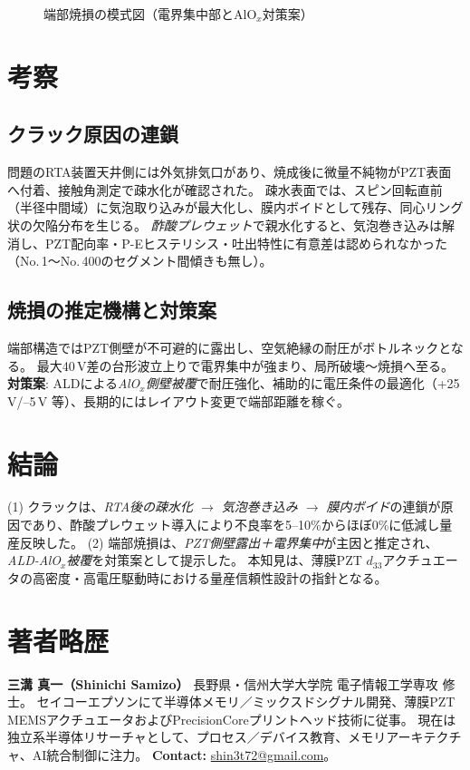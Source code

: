 \documentclass[11pt,a4paper]{ltjsarticle} %
\begin{document}
\begin{figure}[h]
  \centering
  
  \caption{端部焼損の模式図（電界集中部とAlO$_x$対策案）}
  \label{fig:edge}
\end{figure}

\section{考察}
\subsection{クラック原因の連鎖}
問題のRTA装置天井側には外気排気口があり、焼成後に微量不純物がPZT表面へ付着、接触角測定で疎水化が確認された。
疎水表面では、スピン回転直前（半径中間域）に気泡取り込みが最大化し、膜内ボイドとして残存、同心リング状の欠陥分布を生じる。
\emph{酢酸プレウェット}で親水化すると、気泡巻き込みは解消し、PZT配向率・P-Eヒステリシス・吐出特性に有意差は認められなかった（No.\,1～No.\,400のセグメント間傾きも無し）。

\subsection{焼損の推定機構と対策案}
端部構造ではPZT側壁が不可避的に露出し、空気絶縁の耐圧がボトルネックとなる。
最大40\,V差の台形波立上りで電界集中が強まり、局所破壊～焼損へ至る。
\textbf{対策案}: ALDによる\emph{AlO$_x$側壁被覆}で耐圧強化、補助的に電圧条件の最適化（+25\,V/--5\,V 等）、長期的にはレイアウト変更で端部距離を稼ぐ。

\section{結論}
(1) クラックは、\emph{RTA後の疎水化 $\rightarrow$ 気泡巻き込み $\rightarrow$ 膜内ボイド}の連鎖が原因であり、酢酸プレウェット導入により不良率を5--10\%からほぼ0\%に低減し量産反映した。
(2) 端部焼損は、\emph{PZT側壁露出＋電界集中}が主因と推定され、\emph{ALD-AlO$_x$被覆}を対策案として提示した。
本知見は、薄膜PZT $d_{33}$アクチュエータの高密度・高電圧駆動時における量産信頼性設計の指針となる。

\section*{著者略歴}
\textbf{三溝 真一（Shinichi Samizo）} 長野県・信州大学大学院 電子情報工学専攻 修士。
セイコーエプソンにて半導体メモリ／ミックスドシグナル開発、薄膜PZT MEMSアクチュエータおよびPrecisionCoreプリントヘッド技術に従事。
現在は独立系半導体リサーチャとして、プロセス／デバイス教育、メモリアーキテクチャ、AI統合制御に注力。
\textbf{Contact:} \href{mailto:shin3t72@gmail.com}{shin3t72@gmail.com}。
\end{document}
